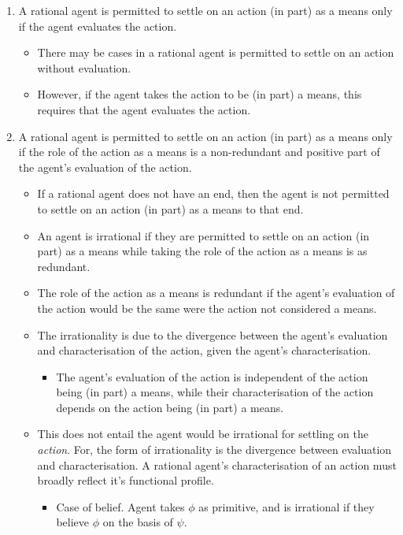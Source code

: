 \documentclass[10pt]{article}
\begin{document}
\begin{enumerate}
\item A rational agent is permitted to settle on an action (in part) as a means only if the agent evaluates the action.
  \begin{itemize}
  \item There may be cases in a rational agent is permitted to settle on an action without evaluation.
  \item However, if the agent takes the action to be (in part) a means, this requires that the agent evaluates the action.
  \end{itemize}
\item A rational agent is permitted to settle on an action (in part) as a means only if the role of the action as a means is a non-redundant and positive part of the agent's evaluation of the action.
  \begin{itemize}
    \item {\color{red} If a rational agent does not have an end, then the agent is not permitted to settle on an action (in part) as a means to that end.}
  \item An agent is irrational if they are permitted to settle on an action (in part) as a means while taking the role of the action as a means is as redundant.
  \item The role of the action as a means is redundant if the agent's evaluation of the action would be the same were the action not considered a means.
  \item The irrationality is due to the divergence between the agent's evaluation and characterisation of the action, given the agent's characterisation.
    \begin{itemize}
    \item The agent's evaluation of the action is independent of the action being (in part) a means, while their characterisation of the action depends on the action being (in part) a means.
    \end{itemize}
  \item This does not entail the agent would be irrational for settling on the \emph{action}.
    For, the form of irrationality is the divergence between evaluation and characterisation.
    A rational agent's characterisation of an action must broadly reflect it's functional profile.
    \begin{itemize}
    \item Case of belief.
      Agent takes \(\phi\) as primitive, and is irrational if they believe \(\phi\) on the basis of \(\psi\).
    \end{itemize}
  \end{itemize}
\end{enumerate}
\end{document}
